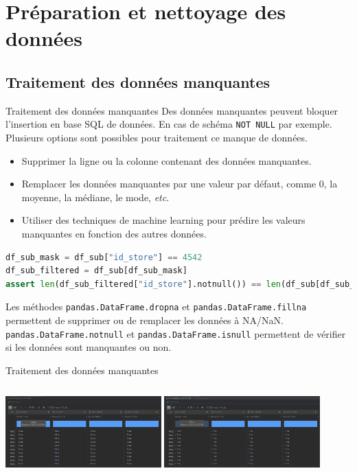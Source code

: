 \documentclass{beamer}
\begin{document}
    \section{Préparation et nettoyage des données}

    \subsection{Traitement des données manquantes}

    \begin{frame}[fragile]{Traitement des données manquantes}
        Des données manquantes peuvent bloquer l'insertion en base SQL de données.
        En cas de schéma \lstinline{NOT NULL} par exemple.
        \bigbreak
        Plusieurs options sont possibles pour traitement ce manque de données.
        \begin{itemize}
            \item Supprimer la ligne ou la colonne contenant des données manquantes.
            \item Remplacer les données manquantes par une valeur par défaut, comme 0, la moyenne, la médiane, le mode, \textit{etc}.
            \item Utiliser des techniques de machine learning pour prédire les valeurs manquantes en fonction des autres données.
        \end{itemize}
        \bigbreak
        \begin{lstlisting}[language=python]
df_sub_mask = df_sub["id_store"] == 4542
df_sub_filtered = df_sub[df_sub_mask]
assert len(df_sub_filtered["id_store"].notnull()) == len(df_sub[df_sub_mask])
        \end{lstlisting}
        Les méthodes \lstinline{pandas.DataFrame.dropna} et \lstinline{pandas.DataFrame.fillna} permettent de supprimer ou de remplacer les données à NA/NaN.
        \lstinline{pandas.DataFrame.notnull} et \lstinline{pandas.DataFrame.isnull} permettent de vérifier si les données sont manquantes ou non.
    \end{frame}

    \begin{frame}{Traitement des données manquantes}
        \begin{columns}
            \centering
            \includegraphics[width=6cm]{image/pandas-isnull}
            \centering
            \includegraphics[width=6cm]{image/pandas-notnull}
        \end{columns}
    \end{frame}
\end{document}
